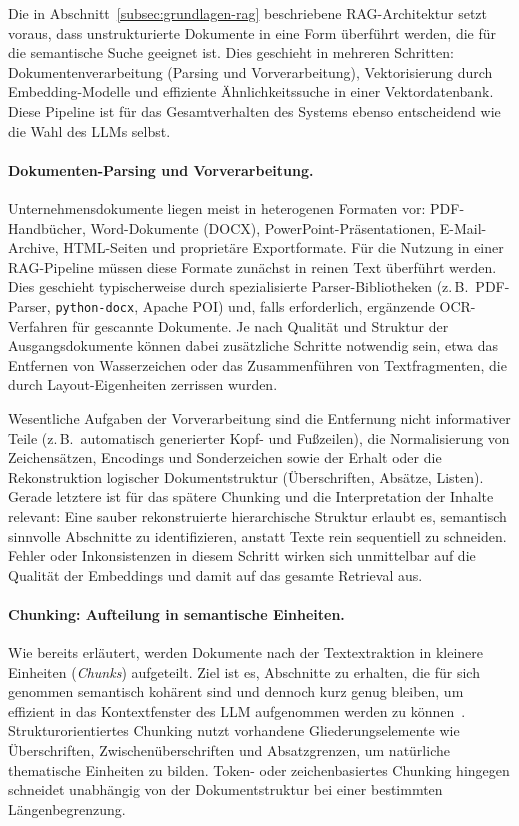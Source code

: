 Die in Abschnitt~\ref{subsec:grundlagen-rag} beschriebene RAG-Architektur setzt voraus, dass unstrukturierte Dokumente in eine Form überführt werden, die für die semantische Suche geeignet ist.
Dies geschieht in mehreren Schritten: Dokumentenverarbeitung (Parsing und Vorverarbeitung), Vektorisierung durch Embedding-Modelle und effiziente Ähnlichkeitssuche in einer Vektordatenbank.
Diese Pipeline ist für das Gesamtverhalten des Systems ebenso entscheidend wie die Wahl des LLMs selbst.

\paragraph{Dokumenten-Parsing und Vorverarbeitung.}

Unternehmensdokumente liegen meist in heterogenen Formaten vor: PDF-Handbücher, Word-Dokumente (DOCX), PowerPoint-Präsentationen, E-Mail-Archive, HTML-Seiten und proprietäre Exportformate.
Für die Nutzung in einer RAG-Pipeline müssen diese Formate zunächst in reinen Text überführt werden.
Dies geschieht typischerweise durch spezialisierte Parser-Bibliotheken (z.\,B.\ PDF-Parser, \texttt{python-docx}, Apache POI) und, falls erforderlich, ergänzende OCR-Verfahren für gescannte Dokumente.
Je nach Qualität und Struktur der Ausgangsdokumente können dabei zusätzliche Schritte notwendig sein, etwa das Entfernen von Wasserzeichen oder das Zusammenführen von Textfragmenten, die durch Layout-Eigenheiten zerrissen wurden.

Wesentliche Aufgaben der Vorverarbeitung sind die Entfernung nicht informativer Teile (z.\,B.\ automatisch generierter Kopf- und Fußzeilen), die Normalisierung von Zeichensätzen, Encodings und Sonderzeichen sowie der Erhalt oder die Rekonstruktion logischer Dokumentstruktur (Überschriften, Absätze, Listen).
Gerade letztere ist für das spätere Chunking und die Interpretation der Inhalte relevant:
Eine sauber rekonstruierte hierarchische Struktur erlaubt es, semantisch sinnvolle Abschnitte zu identifizieren, anstatt Texte rein sequentiell zu schneiden.
Fehler oder Inkonsistenzen in diesem Schritt wirken sich unmittelbar auf die Qualität der Embeddings und damit auf das gesamte Retrieval aus.

\paragraph{Chunking: Aufteilung in semantische Einheiten.}

Wie bereits erläutert, werden Dokumente nach der Textextraktion in kleinere Einheiten (\textit{Chunks}) aufgeteilt.
Ziel ist es, Abschnitte zu erhalten, die für sich genommen semantisch kohärent sind und dennoch kurz genug bleiben, um effizient in das Kontextfenster des LLM aufgenommen werden zu können~\cite{gao2023retrieval}.
Strukturorientiertes Chunking nutzt vorhandene Gliederungselemente wie Überschriften, Zwischenüberschriften und Absatzgrenzen, um natürliche thematische Einheiten zu bilden.
Token- oder zeichenbasiertes Chunking hingegen schneidet unabhängig von der Dokumentstruktur bei einer bestimmten Längenbegrenzung.

